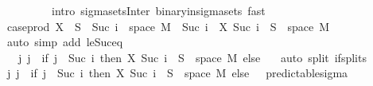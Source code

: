 \begin{isabellebody}
\ \ \ \ \ \ \ \ \ {\isacharparenleft}{\kern0pt}intro\ sigma{\isacharunderscore}{\kern0pt}sets{\isacharunderscore}{\kern0pt}Inter\ binary{\isacharunderscore}{\kern0pt}in{\isacharunderscore}{\kern0pt}sigma{\isacharunderscore}{\kern0pt}sets{\isacharcomma}{\kern0pt}\ fast{\isacharparenright}{\kern0pt}{\isacharplus}{\kern0pt}\isanewline
\ \ \ \ \isamarkupfalse%
\ \isamarkupfalse%
\ {\isachardoublequoteopen}case{\isacharunderscore}{\kern0pt}prod\ X\ {\isacharminus}{\kern0pt}{\isacharbackquote}{\kern0pt}\ S\ {\isasyminter}\ {\isacharparenleft}{\kern0pt}{\isacharbraceleft}{\kern0pt}Suc\ i{\isacharbraceright}{\kern0pt}\ {\isasymtimes}\ space\ M{\isacharparenright}{\kern0pt}\ {\isacharequal}{\kern0pt}\ {\isacharbraceleft}{\kern0pt}Suc\ i{\isacharbraceright}{\kern0pt}\ {\isasymtimes}\ {\isacharparenleft}{\kern0pt}X\ {\isacharparenleft}{\kern0pt}Suc\ i{\isacharparenright}{\kern0pt}\ {\isacharminus}{\kern0pt}{\isacharbackquote}{\kern0pt}\ S\ {\isasyminter}\ space\ M{\isacharparenright}{\kern0pt}{\isachardoublequoteclose}\ \isamarkupfalse%
\ {\isacharparenleft}{\kern0pt}auto\ simp\ add{\isacharcolon}{\kern0pt}\ le{\isacharunderscore}{\kern0pt}Suc{\isacharunderscore}{\kern0pt}eq{\isacharparenright}{\kern0pt}\isanewline
\ \ \ \ \isamarkupfalse%
\ \isamarkupfalse%
\ {\isachardoublequoteopen}{\isachardot}{\kern0pt}{\isachardot}{\kern0pt}{\isachardot}{\kern0pt}\ {\isacharequal}{\kern0pt}\ {\isacharparenleft}{\kern0pt}{\isasymUnion}j{\isachardot}{\kern0pt}\ {\isacharbraceleft}{\kern0pt}j{\isacharbraceright}{\kern0pt}\ {\isasymtimes}\ {\isacharparenleft}{\kern0pt}if\ j\ {\isacharequal}{\kern0pt}\ Suc\ i\ then\ {\isacharparenleft}{\kern0pt}X\ {\isacharparenleft}{\kern0pt}Suc\ i{\isacharparenright}{\kern0pt}\ {\isacharminus}{\kern0pt}{\isacharbackquote}{\kern0pt}\ S\ {\isasyminter}\ space\ M{\isacharparenright}{\kern0pt}\ else\ {\isacharbraceleft}{\kern0pt}{\isacharbraceright}{\kern0pt}{\isacharparenright}{\kern0pt}{\isacharparenright}{\kern0pt}{\isachardoublequoteclose}\ \isamarkupfalse%
\ {\isacharparenleft}{\kern0pt}auto\ split{\isacharcolon}{\kern0pt}\ if{\isacharunderscore}{\kern0pt}splits{\isacharparenright}{\kern0pt}\isanewline
\ \ \ \ \isamarkupfalse%
\ \isamarkupfalse%
\ {\isachardoublequoteopen}{\isacharparenleft}{\kern0pt}{\isasymUnion}j{\isachardot}{\kern0pt}\ {\isacharbraceleft}{\kern0pt}j{\isacharbraceright}{\kern0pt}\ {\isasymtimes}\ {\isacharparenleft}{\kern0pt}if\ j\ {\isacharequal}{\kern0pt}\ Suc\ i\ then\ {\isacharparenleft}{\kern0pt}X\ {\isacharparenleft}{\kern0pt}Suc\ i{\isacharparenright}{\kern0pt}\ {\isacharminus}{\kern0pt}{\isacharbackquote}{\kern0pt}\ S\ {\isasyminter}\ space\ M{\isacharparenright}{\kern0pt}\ else\ {\isacharbraceleft}{\kern0pt}{\isacharbraceright}{\kern0pt}{\isacharparenright}{\kern0pt}{\isacharparenright}{\kern0pt}\ {\isasymin}\ predictable{\isacharunderscore}{\kern0pt}sigma{\isachardoublequoteclose}\ \isamarkupfalse%

\end{isabellebody}
